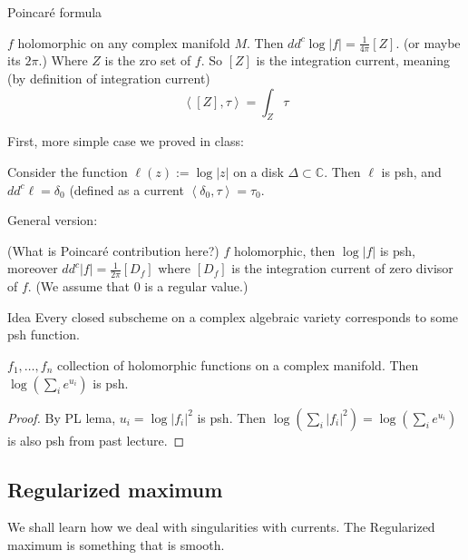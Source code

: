 \begin{thing5}{Poincaré formula}\leavevmode

	\(f\) holomorphic on any complex manifold \(M\). Then \(dd^c \operatorname{log} |f|=\frac{1}{4\pi}[Z]\). (or maybe its \(2\pi\).) Where \(Z\) is the zro set of  \(f\). So  \([Z]\) is the integration current, meaning (by definition of integration current)
	\[\left<[Z],\tau\right>=\int_Z \tau\]
\end{thing5}

First, more simple case we proved in class:

\begin{prop}\leavevmode
Consider the function \(\ell(z):= \operatorname{log} | z|\) on a disk \(\Delta \subset \mathbb{C}\). Then \(\ell\) is psh, and \(dd^c \ell=\delta_0\) (defined as a current \(\left<\delta_0,\tau\right>=\tau_0\).
\end{prop}

General version:

\begin{thm}\leavevmode
	(What is Poincaré contribution here?) \(f\) holomorphic, then \(\operatorname{log}|f|\) is psh, moreover \(dd^c |f|=\frac{1}{2\pi}[D_f]\) where \([D_f]\) is the integration current of zero divisor of \(f\). (We assume that \(0\) is a regular value.)
\end{thm}

\begin{thing6}{Idea}\leavevmode
Every closed subscheme on a complex algebraic variety corresponds to some psh function.
\end{thing6}

\begin{coro}\leavevmode
\(f_1,\ldots,f_n\) collection of holomorphic functions on a complex manifold. Then \(\operatorname{log}\left(\sum_{i}e^{u_i}\right) \) is psh.
\end{coro}

\begin{proof}\leavevmode
By PL lema, \(u_i=\operatorname{log}|f_i|^2\) is psh. Then \(\operatorname{log}\left(\sum_{i}|f_i|^2\right) =\operatorname{log}\left(\sum_{i}e^{u_i}\right) \) is also psh from past lecture.
\end{proof}

\subsection{Regularized maximum}
\begin{upshot}\leavevmode
We shall learn how we deal with singularities with currents. The Regularized maximum is something that is smooth.
\end{upshot}

